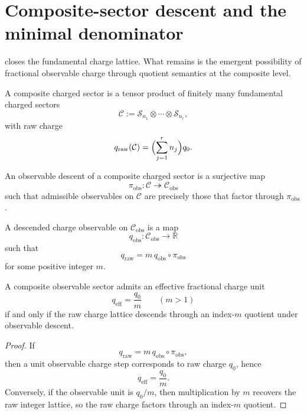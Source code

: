\section{Composite-sector descent and the minimal denominator}
\label{sec:em-composite-quotients}
 closes the fundamental charge lattice.
What remains is the emergent possibility of fractional observable
charge through quotient semantics at the composite level.
\begin{definition}
	A composite charged sector is a tensor product of finitely many
	fundamental charged sectors
	\[
		\mathcal C:=\mathcal S_{n_1}\otimes\cdots\otimes \mathcal S_{n_r},
	\]
	with raw charge
	\[
		q_{\mathrm{raw}}(\mathcal C)=\Bigl(\sum_{j=1}^r n_j\Bigr)q_0.
	\]
\end{definition}
\begin{definition}
	An observable descent of a composite charged sector is a surjective map
	\[
		\pi_{\mathrm{obs}}:\mathcal C\twoheadrightarrow \mathcal C_{\mathrm{obs}}
	\]
	such that admissible observables on \(\mathcal C\) are precisely those
	that factor through \(\pi_{\mathrm{obs}}\).
\end{definition}
\begin{definition}
	A descended charge observable on \(\mathcal C_{\mathrm{obs}}\) is a map
	\[
		q_{\mathrm{obs}}:\mathcal C_{\mathrm{obs}}\to\mathbb R
	\]
	such that
	\[
		q_{\mathrm{raw}}=m\,q_{\mathrm{obs}}\circ \pi_{\mathrm{obs}}
	\]
	for some positive integer \(m\).
\end{definition}
\begin{theorem}
	\label{thm:em-fractional-criterion}
	A composite observable sector admits an effective fractional charge unit
	\[
		q_{\mathrm{eff}}=\frac{q_0}{m}
		\qquad (m>1)
	\]
	if and only if the raw charge lattice descends through an index-\(m\)
	quotient under observable descent.
\end{theorem}
\begin{proof}
	If
	\[
		q_{\mathrm{raw}}=m\,q_{\mathrm{obs}}\circ\pi_{\mathrm{obs}},
	\]
	then a unit observable charge step corresponds to raw charge
	\(q_0\), hence
	\[
		q_{\mathrm{eff}}=\frac{q_0}{m}.
	\]
	Conversely, if the observable unit is \(q_0/m\), then multiplication by
	\(m\) recovers the raw integer lattice, so the raw charge factors
	through an index-\(m\) quotient.
\end{proof}
